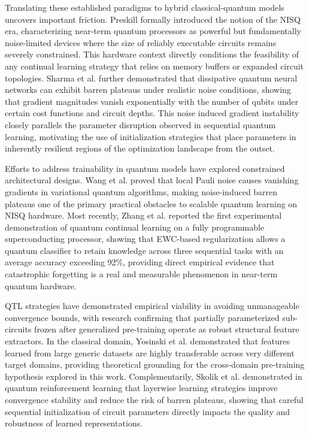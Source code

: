 \documentclass[runningheads]{llncs}
\begin{document}
Translating these established paradigms to hybrid classical-quantum models uncovers important friction. Preskill \cite{Preskill18} formally introduced the notion of the NISQ era, characterizing near-term quantum processors as powerful but fundamentally noise-limited devices where the size of reliably executable circuits remains severely constrained. This hardware context directly conditions the feasibility of any continual learning strategy that relies on memory buffers or expanded circuit topologies. Sharma et al. \cite{Sharma22} further demonstrated that dissipative quantum neural networks can exhibit barren plateaus under realistic noise conditions, showing that gradient magnitudes vanish exponentially with the number of qubits under certain cost functions and circuit depths. This noise induced gradient instability closely parallels the parameter disruption observed in sequential quantum learning, motivating the use of initialization strategies that place parameters in inherently resilient regions of the optimization landscape from the outset.

Efforts to address trainability in quantum models have explored constrained architectural designs. Wang et al. \cite{Wang21} proved that local Pauli noise causes vanishing gradients in variational quantum algorithms, making noise-induced barren plateaus one of the primary practical obstacles to scalable quantum learning on NISQ hardware. Most recently, Zhang et al. \cite{Zhang26} reported the first experimental demonstration of quantum continual learning on a fully programmable superconducting processor, showing that EWC-based regularization allows a quantum classifier to retain knowledge across three sequential tasks with an average accuracy exceeding 92\%, providing direct empirical evidence that catastrophic forgetting is a real and measurable phenomenon in near-term quantum hardware.

QTL strategies have demonstrated empirical viability in avoiding unmanageable convergence bounds, with research confirming that partially parameterized sub-circuits frozen after generalized pre-training operate as robust structural feature extractors. In the classical domain, Yosinski et al. \cite{Yosinski14} demonstrated that features learned from large generic datasets are highly transferable across very different target domains, providing theoretical grounding for the cross-domain pre-training hypothesis explored in this work. Complementarily, Skolik et al. \cite{Skolik21} demonstrated in quantum reinforcement learning that layerwise learning strategies improve convergence stability and reduce the risk of barren plateaus, showing that careful sequential initialization of circuit parameters directly impacts the quality and robustness of learned representations.
\end{document}
